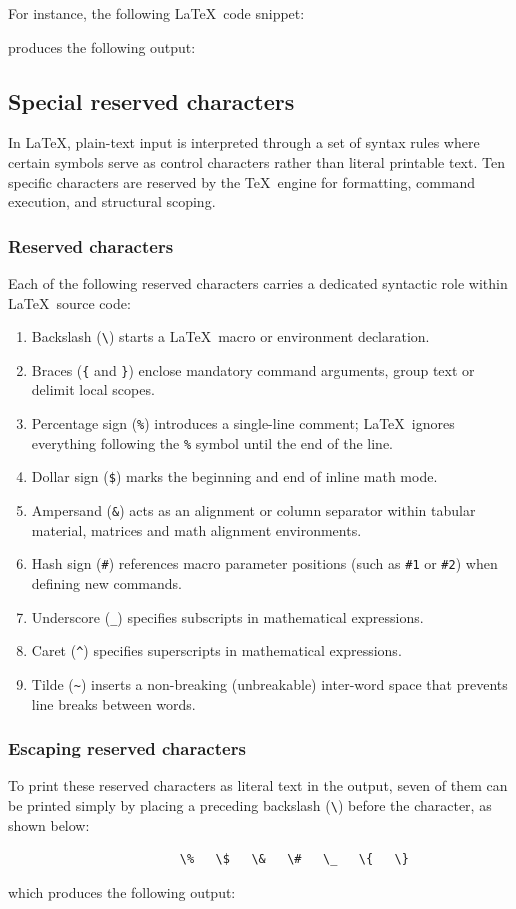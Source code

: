 		For instance, the following \LaTeX\ code snippet:

		produces the following output:
	
	\subsection{Special reserved characters}
		In \LaTeX, plain-text input is interpreted through a set of syntax rules where certain symbols serve as control characters rather than literal printable text. Ten specific characters are reserved by the \TeX\ engine for formatting, command execution, and structural scoping.
		
		\subsubsection{Reserved characters}
			Each of the following reserved characters carries a dedicated syntactic role within \LaTeX\ source code:
			\begin{enumerate}
				\item Backslash (\verb|\|) starts a \LaTeX\ macro or environment declaration.
				\item Braces (\verb|{| and \verb|}|) enclose mandatory command arguments, group text or delimit local scopes.
				\item Percentage sign (\verb|%|) introduces a single-line comment; \LaTeX\ ignores everything following the \verb|%| symbol until the end of the line.
				\item Dollar sign (\verb|$|) marks the beginning and end of inline math mode.
				\item Ampersand (\verb|&|) acts as an alignment or column separator within tabular material, matrices and math alignment environments.
				\item Hash sign (\verb|#|) references macro parameter positions (such as \verb|#1| or \verb|#2|) when defining new commands.
				\item Underscore (\verb|_|) specifies subscripts in mathematical expressions.
				\item Caret (\verb|^|) specifies superscripts in mathematical expressions.
				\item Tilde (\verb|~|) inserts a non-breaking (unbreakable) inter-word space that prevents line breaks between words.
			\end{enumerate}
			
		\subsubsection{Escaping reserved characters}
			To print these reserved characters as literal text in the output, seven of them can be printed simply by placing a preceding backslash (\verb|\|) before the character, as shown below:
			\begin{verbatim}
						\%   \$   \&   \#   \_   \{   \}
			\end{verbatim}
			which produces the following output:
